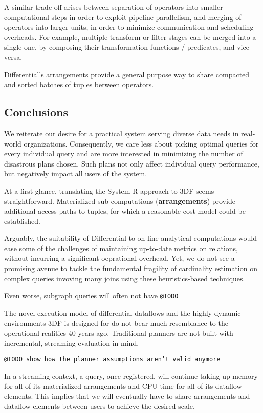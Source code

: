 \documentclass[../index.tex]{subfiles}
\begin{document}
A similar trade-off arises between separation of operators into
smaller computational steps in order to exploit pipeline parallelism,
and merging of operators into larger units, in order to minimize
communication and scheduling overheads. For example, multiple
transform or filter stages can be merged into a single one, by
composing their transformation functions / predicates, and vice versa.

Differential's arrangements provide a general purpose way to share
compacted and sorted batches of tuples between operators.

\subsection{Conclusions}

We reiterate our desire for a practical system serving diverse data
needs in real-world organizations. Consequently, we care less about
picking optimal queries for every individual query and are more
interested in minimizing the number of disastrous plans chosen. Such
plans not only affect individual query performance, but negatively
impact all users of the system.

At a first glance, translating the System R approach to 3DF seems
straightforward. Materialized sub-computations (\textbf{arrangements})
provide additional access-paths to tuples, for which a reasonable cost
model could be established. 

Arguably, the suitability of Differential to on-line analytical
computations would ease some of the challenges of maintaining
up-to-date metrics on relations, without incurring a significant
oeprational overhead. Yet, we do not see a promising avenue to tackle
the fundamental fragility of cardinality estimation on complex queries
invoving many joins using these heuristics-based techniques.

Even worse, subgraph queries will often not have \texttt{@TODO}

The novel execution model of differential dataflows and the highly
dynamic environments 3DF is designed for do not bear much resemblance
to the operational realities 40 years ago. Traditional planners are
not built with incremental, streaming evaluation in mind.

\texttt{@TODO show how the planner assumptions aren't valid anymore}

In a streaming context, a query, once registered, will continue taking
up memory for all of its materialized arrangements and CPU time for
all of its dataflow elements. This implies that we will eventually
have to share arrangements and dataflow elements between users to
achieve the desired scale.
\end{document}
